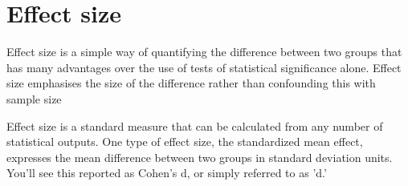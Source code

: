 \section{Effect size}
\label{sec:effect-size}

Effect size is a simple way of quantifying the difference between two groups
that has many advantages over the use of tests of statistical significance
alone. Effect size emphasises the size of the difference rather than confounding
this with sample size


Effect size is a standard measure that can be calculated from any number of
statistical outputs. One type of effect size, the standardized mean effect,
expresses the mean difference between two groups in standard deviation units.
You'll see this reported as Cohen's d, or simply referred to as 'd.'





